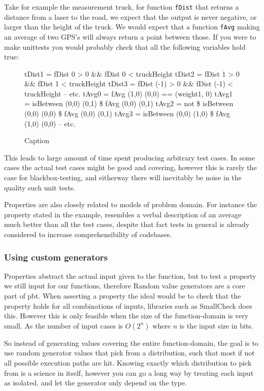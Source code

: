 Take for example the measurement truck, for function \verb|fDist| that returns a distance from a laser to the road, we expect that the output is never negative, or larger than the height of the truck. We would expect that a function \verb|fAvg| making an average of two GPS's will always return a point between those.
If you were to make unittests you would probably check that all the following variables hold true:
\begin{figure}
    \begin{hscode}
        tDist1 = fDist 0 > 0 && fDist 0 < truckHeight
        tDist2 = fDist 1 > 0 && fDist 1 < truckHeight
        tDist3 = fDist (-1) > 0 && fDist (-1) < truckHeight
        -- etc. 
        tAvg0 = fAvg (1,0) (0,0) == (weight1, 0)
        tAvg1 = isBetween (0,0) (0,1) \$ fAvg (0,0) (0,1) 
        tAvg2 = not \$ isBetween (0,0) (0,0) \$ fAvg (0,0) (0,1) 
        tAvg3 = isBetween (0,0) (1,0) \$ fAvg (1,0) (0,0)
        -- etc.    
    \end{hscode}
        \caption{Caption}
    \label{lst:unitTests}
\end{figure}
This leads to large amount of time spent producing arbitrary test cases. In some cases the actual test cases might be good and covering, however this is rarely the case for blackbox-testing, and eitherway there will inevitably be noise in the quality such unit tests.

Properties are also closely related to models of problem domain. For instance the property stated in the example, resembles a verbal description of an average much better than all the test cases, despite that fact tests in general is already considered to increase comprehensibility of codebases.

\subsubsection{Using custom generators}
Properties abstract the actual input given to the function, but to test a property we still input for our functions, therefore Random value generators are a core part of \acrshort{pbt}. When asserting a property the ideal would be to check that the property holds for all combinations of inputs, libraries such as SmallCheck does this. However this is only feasible when the size of the function-domain is very small. As the number of input cases is $O(2^n)$ where $n$ is the input size in bits. 

So instead of generating values covering the entire function-domain, the goal is to use random generator values that pick from a distribution, such that most if not all possible execution paths are hit. Knowing exactly which distribution to pick from is a science in itself, however you can go a long way by treating each input as isolated, and let the generator only depend on the type. 

